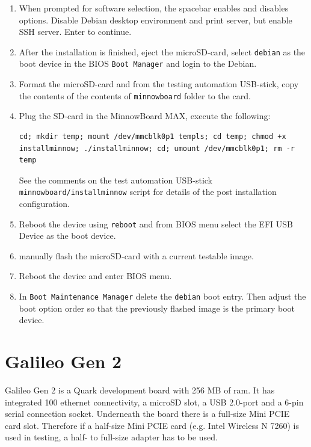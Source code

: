\documentclass[a4paper,11pt]{article}
\newcommand{\cmd}[1]{\texttt{#1}}
\begin{document}
\begin{enumerate}
\item When prompted for software selection, the spacebar enables and disables options. Disable Debian desktop environment and print server, but enable SSH server. Enter to continue.

\item After the installation is finished, eject the microSD-card, select \cmd{debian} as the boot device in the BIOS \cmd{Boot Manager} and login to the Debian.

\item Format the microSD-card and from the testing automation USB-stick, copy the contents of the contents of \cmd{minnowboard} folder to the card.

\item Plug the SD-card in the MinnowBoard MAX, execute the following:
\begin{lstlisting}
cd; mkdir temp; mount /dev/mmcblk0p1 templs; cd temp; chmod +x installminnow; ./installminnow; cd; umount /dev/mmcblk0p1; rm -r temp
\end{lstlisting}

See the comments on the test automation USB-stick \cmd{minnowboard/installminnow} script for details of the post installation configuration.

\item Reboot the device using \cmd{reboot} and from BIOS menu select the EFI USB Device as the boot device.

\item manually flash the microSD-card with a current testable image.

\item Reboot the device and enter BIOS menu.

\item In \cmd{Boot Maintenance Manager} delete the \cmd{debian} boot entry. Then adjust the boot option order so that the previously flashed image is the primary boot device.
\end{enumerate}

\section{Galileo Gen 2}
\label{galileo}

Galileo Gen 2 is a Quark development board with 256 MB of ram. It has integrated 100 ethernet connectivity, a microSD slot, a USB 2.0-port and a 6-pin serial connection socket. Underneath the board there is a full-size Mini PCIE card slot. Therefore if a half-size Mini PCIE card (e.g. Intel Wireless N 7260) is used in testing, a half- to full-size adapter has to be used.
\end{document}
